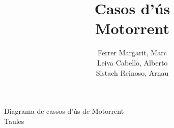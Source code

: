 \documentclass{article}
\author
{
Ferrer Margarit, Marc\\
Leiva Cabello, Alberto\\
Sistach Reinoso, Arnau
}
\title{Casos d'ús\\Motorrent}
\begin{document}
\maketitle
\tableofcontents
\newpage

Diagrama de cassos d'ús de Motorrent\\

Taules\\
\end{document}
